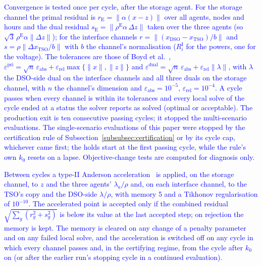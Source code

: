 \documentclass[preprint,12pt]{elsarticle}
\begin{document}
\textcolor{blue}{
    Convergence is tested once per cycle, after the storage agent. For the storage channel the primal residual is $r_{\text{E}} = \lVert \alpha (x - z) \rVert$ over all agents, nodes and hours and the dual residual $s_{\text{E}} = \lVert \rho^{\text{E}} \alpha\, \Delta z \rVert$ taken over the three agents (so $\sqrt{3}\,\rho^{\text{E}} \alpha \lVert \Delta z \rVert$); for the interface channels $r = \lVert (x_{\text{DSO}} - x_{\text{TSO}}) / b \rVert$ and $s = \rho \lVert \Delta x_{\text{TSO}} / b \rVert$ with $b$ the channel's normalisation ($R^{\text{I}}_i$ for the powers, one for the voltage). The tolerances are those of Boyd et al.~\cite{boyd_admm_2011}, $\varepsilon^{\text{pri}} = \sqrt{n}\,\varepsilon_{\text{abs}} + \varepsilon_{\text{rel}} \max\{\lVert x \rVert, \lVert z \rVert\}$ and $\varepsilon^{\text{dual}} = \sqrt{n}\,\varepsilon_{\text{abs}} + \varepsilon_{\text{rel}} \lVert \lambda \rVert$, with $\lambda$ the DSO-side dual on the interface channels and all three duals on the storage channel, with $n$ the channel's dimension and $\varepsilon_{\text{abs}} = 10^{-5}$, $\varepsilon_{\text{rel}} = 10^{-4}$. A cycle passes when every channel is within its tolerances and every local solve of the cycle ended at a status the solver reports as solved (optimal or acceptable). 
    The production exit is ten consecutive passing cycles; it stopped the multi-scenario evaluations. The single-scenario evaluations of this paper were stopped by the certification rule of Subsection~\ref{subsubsec:certification} or by its cycle cap, whichever came first; the holds start at the first passing cycle, while the rule's own $k_0$ resets on a lapse. Objective-change tests are computed for diagnosis only.
}

\textcolor{blue}{
    Between cycles a type-II Anderson acceleration~\cite{walker_ni_2011} is applied, on the storage channel, to $z$ and the three agents' $\lambda_a/\rho$ and, on each interface channel, to the TSO's copy and the DSO-side $\lambda/\rho$, with memory 5 and a Tikhonov regularisation of $10^{-10}$. The accelerated point is accepted only if the combined residual $\sqrt{\sum_g (r_g^2 + s_g^2)}$ is below its value at the last accepted step; on rejection the memory is kept. 
    The memory is cleared on any change of a penalty parameter and on any failed local solve, and the acceleration is switched off on any cycle in which every channel passes and, in the certifying regime, from the cycle after $k_0$ on (or after the earlier run's stopping cycle in a continued evaluation).
}
\end{document}

